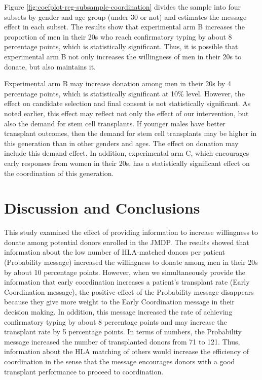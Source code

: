 \documentclass[
]{article}
\begin{document}
Figure \ref{fig:coefplot-reg-subsample-coordination} divides the sample into four subsets by gender and age group (under 30 or not) and estimates the message effect in each subset. The results show that experimental arm B increases the proportion of men in their 20s who reach confirmatory typing by about 8 percentage points, which is statistically significant. Thus, it is possible that experimental arm B not only increases the willingness of men in their 20s to donate, but also maintains it.

Experimental arm B may increase donation among men in their 20s by 4 percentage points, which is statistically significant at 10\% level. However, the effect on candidate selection and final consent is not statistically significant. As noted earlier, this effect may reflect not only the effect of our intervention, but also the demand for stem cell transplants. If younger males have better transplant outcomes, then the demand for stem cell transplants may be higher in this generation than in other genders and ages. The effect on donation may include this demand effect. In addition, experimental arm C, which encourages early responses from women in their 20s, has a statistically significant effect on the coordination of this generation.

\hypertarget{conclusion}{%
\section{Discussion and Conclusions}\label{conclusion}}

This study examined the effect of providing information to increase willingness to donate among potential donors enrolled in the JMDP. The results showed that information about the low number of HLA-matched donors per patient (Probability message) increased the willingness to donate among men in their 20s by about 10 percentage points. However, when we simultaneously provide the information that early coordination increases a patient's transplant rate (Early Coordination message), the positive effect of the Probability message disappears because they give more weight to the Early Coordination message in their decision making. In addition, this message increased the rate of achieving confirmatory typing by about 8 percentage points and may increase the transplant rate by 5 percentage points. In terms of numbers, the Probability message increased the number of transplanted donors from 71 to 121. Thus, information about the HLA matching of others would increase the efficiency of coordination in the sense that the message encourages donors with a good transplant performance to proceed to coordination.
\end{document}
